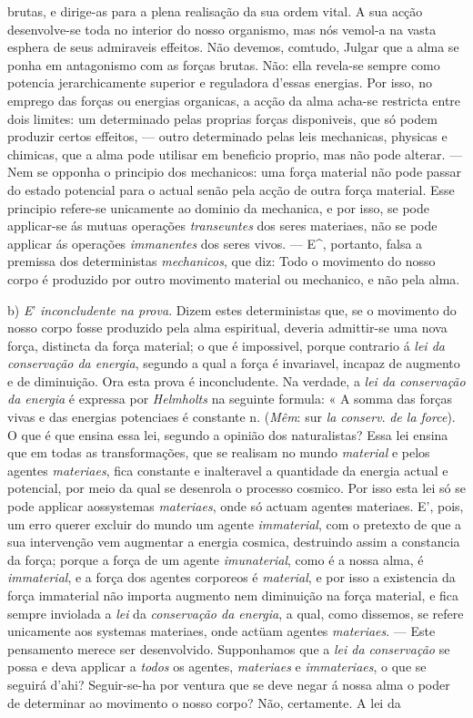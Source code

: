 brutas, e dirige-as para a plena realisação da sua ordem vital. A sua acção desenvolve-se toda no interior do nosso organismo, mas nós vemol-a na vasta esphera de seus admiraveis effeitos. Não devemos, comtudo, Julgar que a alma se ponha em antagonismo com as forças brutas. Não: ella revela-se sempre como potencia jerarchicamente superior e reguladora d'essas energias. Por isso, no emprego das forças ou energias organicas, a acção da alma acha-se restricta entre dois limites: um determinado pelas proprias forças disponiveis, que só podem produzir certos effeitos, --- outro determinado pelas leis mechanicas, physicas e chimicas, que a alma pode utilisar em beneficio proprio, mas não pode alterar. --- Nem se opponha o principio dos mechanicos: uma força material não pode passar do estado potencial para o actual senão pela acção de outra força material. Esse principio refere-se unicamente ao dominio da mechanica, e por isso, se pode applicar-se ás mutuas operações \emph{transeuntes} dos seres materiaes, não se pode applicar ás operações \emph{immanentes} dos seres vivos. --- E\textasciicircum{}, portanto, falsa a premissa dos deterministas \emph{mechanicos}, que diz: Todo o movimento do nosso corpo é produzido por outro movimento material ou mechanico, e não pela alma.\par b) \emph{E}' \emph{inconcludente na prova}. Dizem estes deterministas que, se o movimento do nosso corpo fosse produzido pela alma espiritual, deveria admittir-se uma nova força, distincta da força material; o que é impossivel, porque contrario á \emph{lei da conservação da energia}, segundo a qual a força é invariavel, incapaz de augmento e de diminuição. Ora esta prova é inconcludente. Na verdade, a \emph{lei da conservação da energia} é expressa por \emph{Helmholts} na seguinte formula: « A somma das forças vivas e das energias potenciaes é constante n. (\emph{Mêm}: sur \emph{la conserv}. \emph{de la force}). O que é que ensina essa lei, segundo a opinião dos naturalistas? Essa lei ensina que em todas as transformações, que se realisam no mundo \emph{material} e pelos agentes \emph{materiaes}, fica constante e inalteravel a quantidade da energia actual e potencial, por meio da qual se desenrola o processo cosmico. Por isso esta lei só se pode applicar aossystemas \emph{materiaes}, onde só actuam agentes materiaes. E', pois, um erro querer excluir do mundo um agente \emph{immaterial}, com o pretexto de que a sua intervenção vem augmentar a energia cosmica, destruindo assim a constancia da força; porque a força de um agente \emph{imunaterial}, como é a nossa alma, é \emph{immaterial}, e a força dos agentes corporeos é \emph{material}, e por isso a existencia da força immaterial não importa augmento nem diminuição na força material, e fica sempre inviolada a \emph{lei} da \emph{conservação da energia}, a qual, como dissemos, se refere unicamente aos systemas materiaes, onde actüam agentes \emph{materiaes}. --- Este pensamento merece ser desenvolvido. Supponhamos que a \emph{lei da conservação} se possa e deva applicar a \emph{todos} os agentes, \emph{materiaes} e \emph{immateriaes}, o que se seguirá d'ahi? Seguir-se-ha por ventura que se deve negar á nossa alma o poder de determinar ao movimento o nosso corpo? Não, certamente. A lei da 